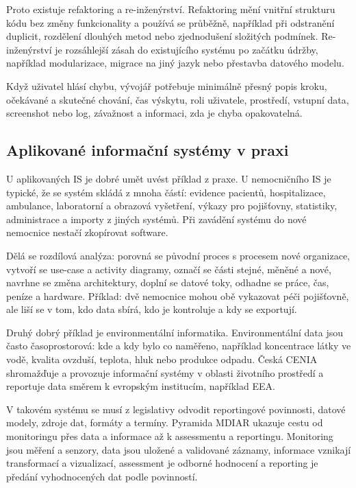 \documentclass[11pt,a4paper]{article}
\begin{document}
Proto existuje refaktoring a re-inženýrství. Refaktoring mění vnitřní strukturu kódu bez změny funkcionality a používá se průběžně, například při odstranění duplicit, rozdělení dlouhých metod nebo zjednodušení složitých podmínek. Re-inženýrství je rozsáhlejší zásah do existujícího systému po začátku údržby, například modularizace, migrace na jiný jazyk nebo přestavba datového modelu.

Když uživatel hlásí chybu, vývojář potřebuje minimálně přesný popis kroku, očekávané a skutečné chování, čas výskytu, roli uživatele, prostředí, vstupní data, screenshot nebo log, závažnost a informaci, zda je chyba opakovatelná.

\subsection*{Aplikované informační systémy v praxi}

U aplikovaných IS je dobré umět uvést příklad z praxe. U nemocničního IS je typické, že se systém skládá z mnoha částí: evidence pacientů, hospitalizace, ambulance, laboratorní a obrazová vyšetření, výkazy pro pojišťovny, statistiky, administrace a importy z jiných systémů. Při zavádění systému do nové nemocnice nestačí zkopírovat software.

Dělá se rozdílová analýza: porovná se původní proces s procesem nové organizace, vytvoří se use-case a activity diagramy, označí se části stejné, měněné a nové, navrhne se změna architektury, doplní se datové toky, odhadne se práce, čas, peníze a hardware. Příklad: dvě nemocnice mohou obě vykazovat péči pojišťovně, ale liší se v tom, kdo data sbírá, kdo je kontroluje a kdy se exportují.

Druhý dobrý příklad je environmentální informatika. Environmentální data jsou často časoprostorová: kde a kdy bylo co naměřeno, například koncentrace látky ve vodě, kvalita ovzduší, teplota, hluk nebo produkce odpadu. Česká CENIA shromažďuje a provozuje informační systémy v oblasti životního prostředí a reportuje data směrem k evropským institucím, například EEA.

V takovém systému se musí z legislativy odvodit reportingové povinnosti, datové modely, zdroje dat, formáty a termíny. Pyramida MDIAR ukazuje cestu od monitoringu přes data a informace až k assessmentu a reportingu. Monitoring jsou měření a senzory, data jsou uložené a validované záznamy, informace vznikají transformací a vizualizací, assessment je odborné hodnocení a reporting je předání vyhodnocených dat podle povinností.
\end{document}
